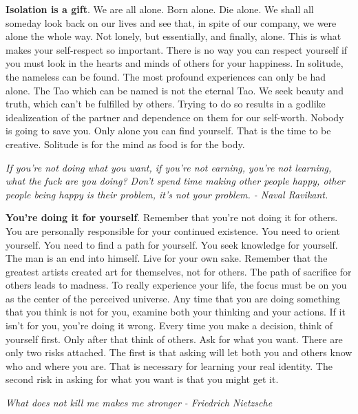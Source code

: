 \documentclass[a4paper,hidelinks]{article}
\begin{document}
\textbf{Isolation is a gift}.
We are all alone.
Born alone.
Die alone.
We shall all someday look back on our lives and see that, in spite of our company, we were alone the whole way.
Not lonely, but essentially, and finally, alone.
This is what makes your self-respect so important.
There is no way you can respect yourself if you must look in the hearts and minds of others for your happiness.
In solitude, the nameless can be found.
The most profound experiences can only be had alone.
The Tao which can be named is not the eternal Tao.
We seek beauty and truth, which can't be fulfilled by others.
Trying to do so results in a godlike idealizeation of the partner and dependence on them for our self-worth.
Nobody is going to save you.
Only alone you can find yourself.
That is the time to be creative.
Solitude is for the mind as food is for the body.

\newpage

\begin{center}
\textit{If you're not doing what you want, if you're not earning, you're not learning, what the fuck are you doing? Don't spend time making other people happy, other people being happy is their problem, it's not your problem. - Naval Ravikant.}
\end{center}

\textbf{You're doing it for yourself}.
Remember that you're not doing it for others.
You are personally responsible for your continued existence.
You need to orient yourself.
You need to find a path for yourself.
You seek knowledge for yourself.
The man is an end into himself.
Live for your own sake.
Remember that the greatest artists created art for themselves, not for others.
The path of sacrifice for others leads to madness.
To really experience your life, the focus must be on you as the center of the perceived universe.
Any time that you are doing something that you think is not for you, examine both your thinking and your actions.
If it isn't for you, you’re doing it wrong.
Every time you make a decision, think of yourself first.
Only after that think of others.
Ask for what you want.
There are only two risks attached.
The first is that asking will let both you and others know who and where you are.
That is necessary for learning your real identity.
The second risk in asking for what you want is that you might get it.

\newpage

\begin{center}
\textit{What does not kill me makes me stronger - Friedrich Nietzsche}
\end{center}
\end{document}
